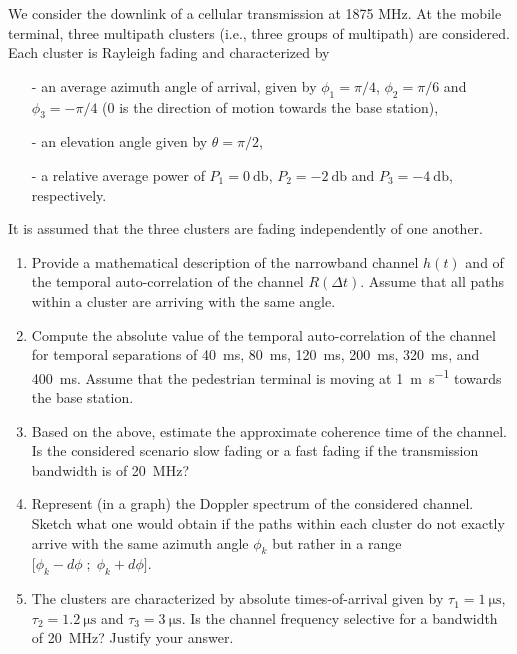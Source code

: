 \documentclass [a4paper, 11pt] {article}
\begin{document}
    \begin{exercise}{1}
        We consider the downlink of a cellular transmission at 1875 MHz. At the mobile terminal, three multipath clusters (i.e., three groups of multipath) are considered. Each cluster is Rayleigh fading and characterized by 

        \begin{itemize}
            \item[-] an average azimuth angle of arrival, given by $\phi_1 = \pi/4$, $\phi_2 = \pi/6$ and $\phi_3 = -\pi/4$ (0 is the direction of motion towards the base station),
            \item[-] an elevation angle given by $\theta = \pi/2$,
            \item[-] a relative average power of $P_1 = \SI{0}{\decibel}$, $P_2 = \SI{-2}{\decibel}$ and $P_3 = \SI{-4}{\decibel}$, respectively.
        \end{itemize}
        
        
        It is assumed that the three clusters are fading independently of one another.
        
        \begin{enumerate}
        \item Provide a mathematical description of the narrowband channel $h(t)$ and of the temporal auto-correlation of the channel $R(\Delta t)$. Assume that all paths within a cluster are arriving with the same angle.
        \item Compute the absolute value of the temporal auto-correlation of the channel for temporal separations of \SI{40}{\milli\second}, \SI{80}{\milli\second}, \SI{120}{\milli\second}, \SI{200}{\milli\second}, \SI{320}{\milli\second}, and \SI{400}{\milli\second}. Assume that the pedestrian terminal is moving at \SI{1}{\meter\per\second} towards the base station.
        \item Based on the above, estimate the approximate coherence time of the channel. Is the considered scenario slow fading or a fast fading if the transmission bandwidth is of \SI{20}{\mega\hertz}?
        \item Represent (in a graph) the Doppler spectrum of the considered channel. Sketch what one would obtain if the paths within each cluster do not exactly arrive with the same azimuth angle $\phi_k$ but rather in a range $\big[\phi_k-d\phi \; ; \; \phi_k+d\phi \big]$.
        \item The clusters are characterized by absolute times-of-arrival given by $\tau_1 = \SI{1}{\micro\second}$, $\tau_2 = \SI{1.2}{\micro\second}$ and $\tau_3 = \SI{3}{\micro\second}$. Is the channel frequency selective for a bandwidth of \SI{20}{\mega\hertz}? Justify your answer.
        \end{enumerate}
    \end{exercise}
    
\end{document}
